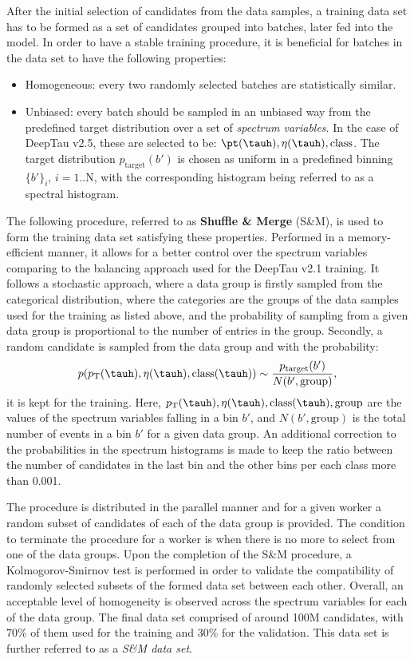 After the initial selection of \tauh candidates from the data samples, a training data set has to be formed as a set of \tauh candidates grouped into batches, later fed into the model. In order to have a stable training procedure, it is beneficial for batches in the data set to have the following properties:
\begin{itemize}
    \item Homogeneous: every two randomly selected batches are statistically similar. 
    \item Unbiased: every batch should be sampled in an unbiased way from the predefined target distribution over a set of \textit{spectrum variables}. In the case of DeepTau v2.5, these are selected to be: $\pt(\tauh), \eta(\tauh), \text{class}$. The target distribution $p_\text{target}(b')$ is chosen as uniform in a predefined binning $\{b'\}_i, \, i=1..\text{N}$, with the corresponding histogram being referred to as a spectral histogram. 
\end{itemize}

The following procedure, referred to as \textbf{Shuffle \& Merge} (S\&M), is used to form the training data set satisfying these properties. Performed in a memory-efficient manner, it allows for a better control over the spectrum variables comparing to the balancing approach used for the DeepTau v2.1 training. It follows a stochastic approach, where a data group is firstly sampled from the categorical distribution, where the categories are the groups of the data samples used for the training as listed above, and the probability of sampling from a given data group is proportional to the number of entries in the group. Secondly, a random \tauh candidate is sampled from the data group and with the probability:
\begin{equation}
    p(p_\text{T}(\tauh), \eta(\tauh), \text{class}(\tauh)) \sim \dfrac{p_\text{target}(b')}{N(b',\text{group})},
\end{equation}
 it is kept for the training. Here, $p_\text{T}(\tauh), \eta(\tauh), \text{class}(\tauh), \text{group}$ are the values of the spectrum variables falling in a bin $b'$, and $N(b', \text{group})$ is the total number of events in a bin $b'$ for a given data group. An additional correction to the probabilities in the spectrum histograms is made to keep the ratio between the number of \tauh candidates in the last \pt bin and the other \pt bins per each class more than 0.001. 

The procedure is distributed in the parallel manner and for a given worker a random subset of \tauh candidates of each of the data group is provided. The condition to terminate the procedure for a worker is when there is no more \tauh to select from one of the data groups. Upon the completion of the S\&M procedure, a Kolmogorov-Smirnov test is performed in order to validate the compatibility of randomly selected subsets of the formed data set between each other. Overall, an acceptable level of homogeneity is observed across the spectrum variables for each of the data group. The final data set comprised of around 100M \tauh candidates, with 70\% of them used for the training and 30\% for the validation. This data set is further referred to as a \textit{S\&M data set}.  

